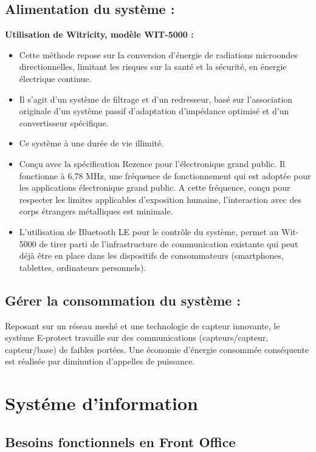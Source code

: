 \subsection{Alimentation du système :} 

\textbf{Utilisation de Witricity, modèle WIT-5000 :} 
\begin{itemize}
\item Cette méthode repose sur la conversion d’énergie de radiations microondes directionnelles, limitant les risques sur la santé et la sécurité, en énergie électrique continue.
\item Il s’agit d’un système de filtrage et d’un redresseur, basé sur l’association originale d’un système passif d’adaptation d’impédance optimisé et d’un convertisseur spécifique.
\item Ce système à une durée de vie illimité.
\item Conçu avec la spécification Rezence pour l'électronique grand public. Il fonctionne à 6,78 MHz, une fréquence de fonctionnement qui est adoptée pour les applications électronique grand public. A cette fréquence, conçu pour respecter les limites applicables d'exposition humaine, l’interaction avec des corps étrangers métalliques est minimale.
\item L'utilisation de Bluetooth LE pour le contrôle du système, permet au Wit-5000 de tirer parti de l'infrastructure de communication existante qui peut déjà être en place dans les dispositifs de consommateurs (smartphones, tablettes, ordinateurs personnels).\cite{www:Witricity}\\
\end{itemize}


\subsection{Gérer la consommation du système :}

Reposant sur un réseau meshé et une technologie de capteur innovante, le système E-protect travaille sur des communications (capteurs/capteur, capteur/base) de faibles portées. Une économie d'énergie consommée conséquente est réalisée par diminution d'appelles de puissance.



\section{Systéme d'information}

\subsection{Besoins fonctionnels en Front Office}

